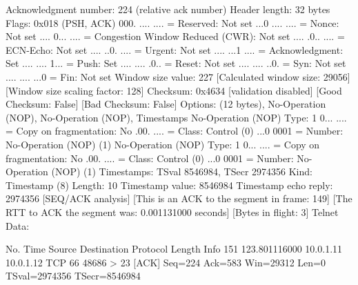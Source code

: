     Acknowledgment number: 224    (relative ack number)
    Header length: 32 bytes
    Flags: 0x018 (PSH, ACK)
        000. .... .... = Reserved: Not set
        ...0 .... .... = Nonce: Not set
        .... 0... .... = Congestion Window Reduced (CWR): Not set
        .... .0.. .... = ECN-Echo: Not set
        .... ..0. .... = Urgent: Not set
        .... ...1 .... = Acknowledgment: Set
        .... .... 1... = Push: Set
        .... .... .0.. = Reset: Not set
        .... .... ..0. = Syn: Not set
        .... .... ...0 = Fin: Not set
    Window size value: 227
    [Calculated window size: 29056]
    [Window size scaling factor: 128]
    Checksum: 0x4634 [validation disabled]
        [Good Checksum: False]
        [Bad Checksum: False]
    Options: (12 bytes), No-Operation (NOP), No-Operation (NOP), Timestamps
        No-Operation (NOP)
            Type: 1
                0... .... = Copy on fragmentation: No
                .00. .... = Class: Control (0)
                ...0 0001 = Number: No-Operation (NOP) (1)
        No-Operation (NOP)
            Type: 1
                0... .... = Copy on fragmentation: No
                .00. .... = Class: Control (0)
                ...0 0001 = Number: No-Operation (NOP) (1)
        Timestamps: TSval 8546984, TSecr 2974356
            Kind: Timestamp (8)
            Length: 10
            Timestamp value: 8546984
            Timestamp echo reply: 2974356
    [SEQ/ACK analysis]
        [This is an ACK to the segment in frame: 149]
        [The RTT to ACK the segment was: 0.001131000 seconds]
        [Bytes in flight: 3]
Telnet
    Data: 

No.     Time           Source                Destination           Protocol Length Info
    151 123.801116000  10.0.1.11             10.0.1.12             TCP      66     48686 > 23 [ACK] Seq=224 Ack=583 Win=29312 Len=0 TSval=2974356 TSecr=8546984

